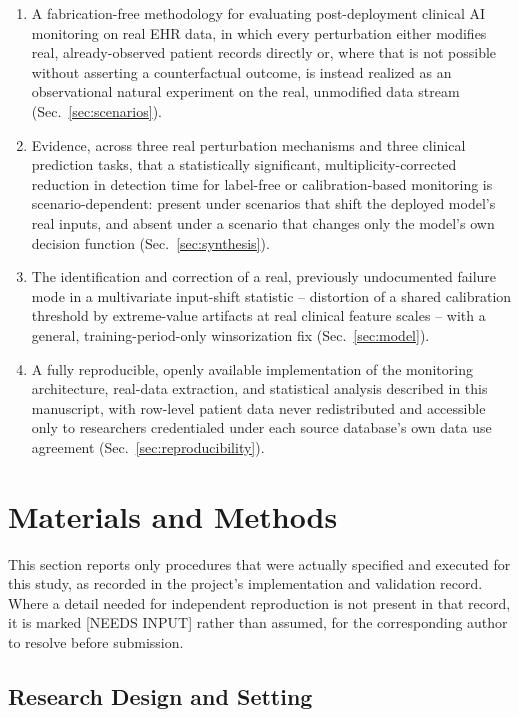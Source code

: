 \documentclass[apajournal,article,submit,oneauthor]{Definitions/mdpi}
\begin{document}
\begin{enumerate}
\item A fabrication-free methodology for evaluating post-deployment clinical AI monitoring on real EHR data, in which every perturbation either modifies real, already-observed patient records directly or, where that is not possible without asserting a counterfactual outcome, is instead realized as an observational natural experiment on the real, unmodified data stream (Sec.~\ref{sec:scenarios}).
\item Evidence, across three real perturbation mechanisms and three clinical prediction tasks, that a statistically significant, multiplicity-corrected reduction in detection time for label-free or calibration-based monitoring is scenario-dependent: present under scenarios that shift the deployed model's real inputs, and absent under a scenario that changes only the model's own decision function (Sec.~\ref{sec:synthesis}).
\item The identification and correction of a real, previously undocumented failure mode in a multivariate input-shift statistic -- distortion of a shared calibration threshold by extreme-value artifacts at real clinical feature scales -- with a general, training-period-only winsorization fix (Sec.~\ref{sec:model}).
\item A fully reproducible, openly available implementation of the monitoring architecture, real-data extraction, and statistical analysis described in this manuscript, with row-level patient data never redistributed and accessible only to researchers credentialed under each source database's own data use agreement (Sec.~\ref{sec:reproducibility}).
\end{enumerate}

\section{Materials and Methods}

This section reports only procedures that were actually specified and executed for this study, as recorded in the project's implementation and validation record. Where a detail needed for independent reproduction is not present in that record, it is marked [NEEDS INPUT] rather than assumed, for the corresponding author to resolve before submission.

\subsection{Research Design and Setting}
\end{document}
